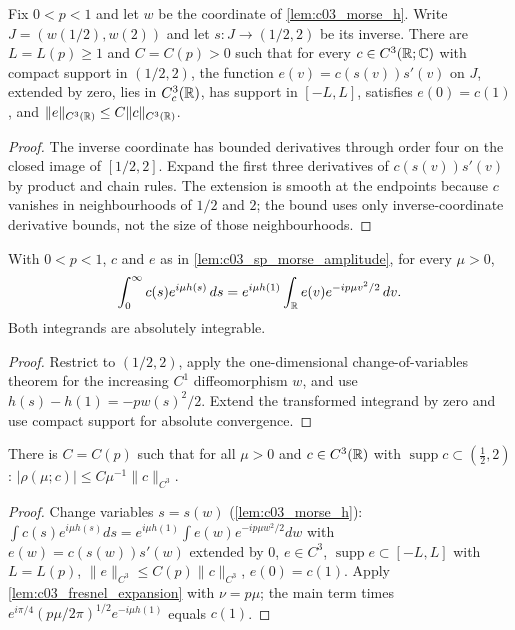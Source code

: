 \begin{lemma}
  \label{lem:c03_sp_morse_amplitude}
  Fix $0<p<1$ and let $w$ be the coordinate of \cref{lem:c03_morse_h}.
  Write $J=(w(1/2),w(2))$ and let $s:J\to(1/2,2)$ be its inverse.
  There are $L=L(p)\ge1$ and $C=C(p)>0$ such that for every
  $c\in C^3(\mathbb{R};\mathbb{C})$ with compact support in $(1/2,2)$, the function
  $e(v)=c(s(v))s'(v)$ on $J$, extended by zero, lies in $C_c^3(\mathbb{R})$,
  has support in $[-L,L]$, satisfies $e(0)=c(1)$, and
  $\|e\|_{C^3(\mathbb{R})}\le C\|c\|_{C^3(\mathbb{R})}$.
\end{lemma}
\begin{proof}
  The inverse coordinate has bounded derivatives through order four on the closed image
  of $[1/2,2]$. Expand the first three derivatives of $c(s(v))s'(v)$ by product and chain rules.
  The extension is smooth at the endpoints because $c$ vanishes in neighbourhoods of $1/2$ and $2$;
  the bound uses only inverse-coordinate derivative bounds, not the size of those neighbourhoods.
\end{proof}

\begin{lemma}
  \label{lem:c03_sp_morse_integral}
  With $0<p<1$, $c$ and $e$ as in \cref{lem:c03_sp_morse_amplitude}, for every $\mu>0$,
  \[
    \int_0^\infty c(s)e^{i\mu h(s)}\,ds
       =e^{i\mu h(1)}\int_{\mathbb{R}} e(v)e^{-ip\mu v^2/2}\,dv.
  \]
  Both integrands are absolutely integrable.
\end{lemma}
\begin{proof}
  Restrict to $(1/2,2)$, apply the one-dimensional change-of-variables theorem for the increasing
  $C^1$ diffeomorphism $w$, and use $h(s)-h(1)=-p w(s)^2/2$.
  Extend the transformed integrand by zero and use compact support for absolute convergence.
\end{proof}

\begin{lemma}
  \label{lem:c03_sp_compact}
  There is $C=C(p)$ such that for all $\mu>0$ and $c\in C^3(\mathbb{R})$ with $\operatorname{supp}c\subset(\frac12,2)$:
  $|\rho(\mu;c)|\le C\mu^{-1}\|c\|_{C^3}$.
\end{lemma}
\begin{proof}
  Change variables $s=s(w)$ (\cref{lem:c03_morse_h}): $\int c(s)e^{i\mu h(s)}ds=e^{i\mu h(1)}\int e(w)e^{-ip\mu w^2/2}dw$ with $e(w)=c(s(w))s'(w)$ extended by $0$, $e\in C^3$, $\operatorname{supp}e\subset[-L,L]$ with $L=L(p)$, $\|e\|_{C^3}\le C(p)\|c\|_{C^3}$, $e(0)=c(1)$.
  Apply \cref{lem:c03_fresnel_expansion} with $\nu=p\mu$; the main term times $e^{i\pi/4}(p\mu/2\pi)^{1/2}e^{-i\mu h(1)}$ equals $c(1)$.
\end{proof}

